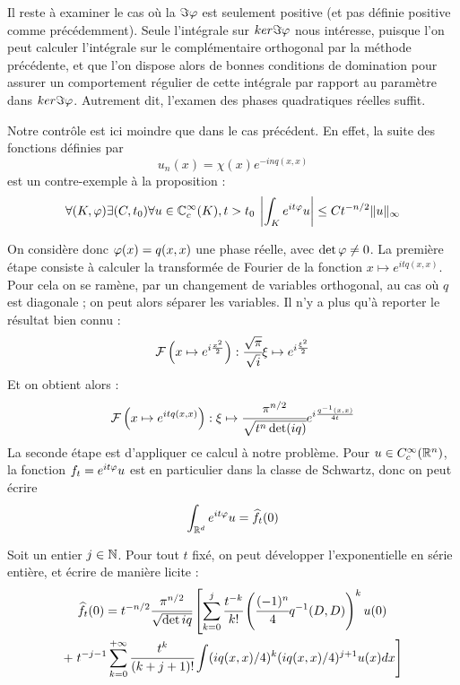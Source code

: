 Il reste à examiner le cas où la $\Im \varphi$ est seulement positive (et pas définie positive comme précédemment). Seule l'intégrale sur $ker \Im \varphi$ nous intéresse, puisque l'on peut calculer l'intégrale sur le complémentaire orthogonal par la méthode précédente, et que l'on dispose alors de bonnes conditions de domination pour assurer un comportement régulier de cette intégrale par rapport au paramètre dans $ker \Im \varphi$. Autrement dit, l'examen des phases quadratiques réelles suffit.

Notre contrôle est ici moindre que dans le cas précédent. En effet, la suite des fonctions définies par
\begin{equation*}
  u_n(x)=\chi(x)e^{-inq(x,x)}
\end{equation*}
est un contre-exemple à la proposition :
\begin{equation*}
  \forall (K,\varphi) \exists (C,t_0) \forall u \in \mathbb{C}^{\infty}_c(K),t>t_0\: \left|\int_Ke^{it\varphi}u\right| \leq Ct^{-n/2}\|u\|_{\infty}
\end{equation*}

On considère donc $\varphi(x)=q(x,x)$ une phase réelle, avec $\det \varphi \neq 0$. La première étape consiste à calculer la transformée de Fourier de la fonction $x\mapsto e^{itq(x,x)}$. Pour cela on se ramène, par un changement de variables orthogonal, au cas où $q$ est diagonale ; on peut alors séparer les variables. Il n'y a plus qu'à reporter le résultat bien connu :
\begin{equation*}
  \mathcal{F}\left(x\mapsto e^{i\frac{x^2}{2}}\right) : \cfrac{\sqrt{\pi}}{\sqrt{i}}\xi \mapsto e^{i\frac{\xi^2}{2}}
\end{equation*}
\noindent Et on obtient alors :
\begin{equation*}
  \mathcal{F}\left(x\mapsto e^{itq(x,x)}\right) : \xi \mapsto \cfrac{\pi^{n/2}}{\sqrt{t^n \det (iq)}}e^{i\frac{q^{-1}(x,x)}{4t}}
\end{equation*}
La seconde étape est d'appliquer ce calcul à notre problème. Pour $u \in C^{\infty}_c(\mathbb{R}^n)$, la fonction $f_t=e^{it\varphi}u$ est en particulier dans la classe de Schwartz, donc on peut écrire
\begin{equation*}
  \int_{\mathbb{R}^d}e^{it\varphi}u = \widehat{f_t}(0)
\end{equation*}

Soit un entier $j \in \mathbb{N}$. Pour tout $t$ fixé, on peut développer l'exponentielle en série entière, et écrire de manière licite :
\begin{multline*}
  \widehat{f_t}(0)=t^{-n/2}\cfrac{\pi^{n/2}}{\sqrt{\det{iq}}}\left[\sum_{k=0}^{j}\cfrac{t^{-k}}{k!}\left(\cfrac{(-1)^n}{4}q^{-1}(D,D)\right)^ku(0)\right. \\+ \left.t^{-j-1}\sum_{k=0}^{+\infty}\cfrac{t^k}{(k+j+1)!}\int (iq(x,x)/4)^k(iq(x,x)/4)^{j+1}u(x)dx\right]
\end{multline*}

